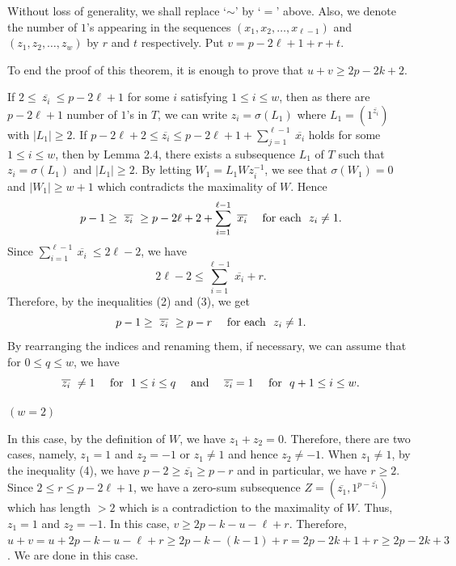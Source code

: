 \documentclass[fleqn]{mat01}
\begin{document}
\begin{pot}
{Without loss of generality, we shall replace `$\sim$' by `$=$' above. Also,
we denote the number of $1$'s appearing in the sequences
$(x_1,x_2,\ldots, x_{\ell-1})$ and $(z_1, z_2, \ldots, z_w)$ by $r$ and
$t$ respectively. Put $v = p-2\ell +1+r+t$.

To end the proof of this theorem, it is enough to prove that $u+v\geq
2p-2k+2$.

If $2\leq \ \overline{z_i} \ \leq p-2\ell+1$ for some $i$ satisfying
$1\leq i \leq w$, then as there are $p-2\ell+1$ number of $1$'s in $T$,
we can write $z_i = \sigma(L_1)$ where $L_1 = (1^{\overline{z_i}})$ with
$|L_1|\geq 2$. If $p-2\ell+2\leq \overline{z_i}\leq p-2\ell+1+
\sum_{j=1}^{\ell-1}\ \overline{x_i} $ holds for some $1\leq i\leq w$,
then by Lemma 2.4, there exists a subsequence $L_1$ of $T$ such that
$z_i = \sigma(L_1)$ and $|L_1| \geq 2$. By letting $W_1 = L_1Wz_i^{-1}$,
we see that $\sigma(W_1) = 0$ and $|W_1| \geq w+1$ which contradicts the
maximality of $W$. Hence
\begin{equation}
p-1\geq \ \overline{z_i} \ \geq p-2\ell + 2+\sum_{i=1}^{\ell-1} \
\overline{x_i} \quad \hbox{ for each } \ z_i\ne 1.
\end{equation}
Since $\sum_{i=1}^{\ell-1} \ \overline{x_i} \ \leq 2\ell-2$, we have
\begin{equation}
2\ell-2\leq \sum_{i=1}^{\ell-1} \ \overline{x_i} +r.
\end{equation}
Therefore, by the inequalities (2) and (3), we get
\begin{equation}
p-1\geq \ \overline{z_i} \ \geq p-r \quad \hbox{ for each } \ z_i\ne 1.
\end{equation}
By rearranging the indices and renaming them, if necessary, we can assume
that for $0\leq q \leq w$, we have
\begin{equation}
\overline{z_i} \ \ne 1 \quad \hbox{ for } \ 1\leq i\leq q \quad \hbox{
and } \quad \overline{z_i} = 1 \quad \mbox{ for } \ q+1\leq i\leq w.
\end{equation}
\pagebreak

\begin{case}
$(w = 2)$
\end{case}

\noindent In this case, by the definition of $W$, we have $z_1+z_2 = 0$.
Therefore, there are two cases, namely, $z_1 = 1$ and $z_2 = -1$ or
$z_1\ne 1$ and hence $z_2\ne -1$. When $z_1\ne 1$, by the inequality
(4), we have $p-2\geq \overline{z_1}\geq p-r$ and in particular, we have
$r\geq 2$. Since $2\leq r \leq p-2\ell+1$, we have a zero-sum
subsequence $Z = (\overline{z_1}, 1^{p-\overline{z_1}})$ which has
length $ > 2$ which is a contradiction to the maximality of $W$. Thus,
$z_1 = 1$ and $z_2 = -1$. In this case, $v\geq 2p-k-u-\ell+r$.
Therefore, $u+v = u+2p-k-u-\ell+r \geq 2p -k-(k-1)+r = 2p -2k+1+r\geq
2p-2k+3$. We are done in this case.

}
\end{pot}
\end{document}
